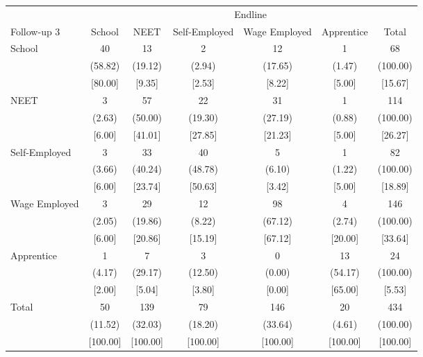 {
\def\sym#1{\ifmmode^{#1}\else\(^{#1}\)\fi}
\begin{tabular}{l*{6}{c}}
\hline\hline
            &\multicolumn{6}{c}{Endline}                                                  \\
Follow-up 3 &      School&        NEET&Self-Employed&Wage Employed&  Apprentice&       Total\\
\hline
School      &          40&          13&           2&          12&           1&          68\\
            &     (58.82)&     (19.12)&      (2.94)&     (17.65)&      (1.47)&    (100.00)\\
            &     [80.00]&      [9.35]&      [2.53]&      [8.22]&      [5.00]&     [15.67]\\
NEET        &           3&          57&          22&          31&           1&         114\\
            &      (2.63)&     (50.00)&     (19.30)&     (27.19)&      (0.88)&    (100.00)\\
            &      [6.00]&     [41.01]&     [27.85]&     [21.23]&      [5.00]&     [26.27]\\
Self-Employed&           3&          33&          40&           5&           1&          82\\
            &      (3.66)&     (40.24)&     (48.78)&      (6.10)&      (1.22)&    (100.00)\\
            &      [6.00]&     [23.74]&     [50.63]&      [3.42]&      [5.00]&     [18.89]\\
Wage Employed&           3&          29&          12&          98&           4&         146\\
            &      (2.05)&     (19.86)&      (8.22)&     (67.12)&      (2.74)&    (100.00)\\
            &      [6.00]&     [20.86]&     [15.19]&     [67.12]&     [20.00]&     [33.64]\\
Apprentice  &           1&           7&           3&           0&          13&          24\\
            &      (4.17)&     (29.17)&     (12.50)&      (0.00)&     (54.17)&    (100.00)\\
            &      [2.00]&      [5.04]&      [3.80]&      [0.00]&     [65.00]&      [5.53]\\
Total       &          50&         139&          79&         146&          20&         434\\
            &     (11.52)&     (32.03)&     (18.20)&     (33.64)&      (4.61)&    (100.00)\\
            &    [100.00]&    [100.00]&    [100.00]&    [100.00]&    [100.00]&    [100.00]\\
\hline\hline
\end{tabular}
}
